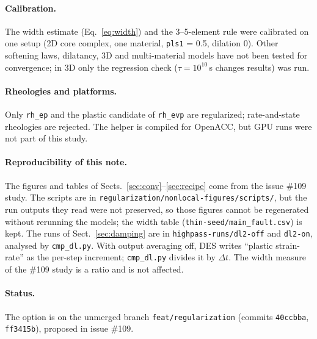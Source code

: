 \documentclass[11pt]{article}
\newcommand{\code}[1]{\texttt{#1}}
\begin{document}
\paragraph{Calibration.} The width estimate (Eq.~\ref{eq:width}) and the 3--5-element rule were
calibrated on one setup (2D core complex, one material, \code{pls1} = 0.5, dilation 0). Other
softening laws, dilatancy, 3D and multi-material models have not been tested for convergence; in 3D
only the regression check ($\tau=10^{10}$\,s changes results) was run.

\paragraph{Rheologies and platforms.} Only \code{rh\_ep} and the plastic candidate of \code{rh\_evp}
are regularized; rate-and-state rheologies are rejected. The helper is compiled for OpenACC, but GPU
runs were not part of this study.

\paragraph{Reproducibility of this note.} The figures and tables of Sects.~\ref{sec:conv}--\ref{sec:recipe}
come from the issue \#109 study. The scripts are in \code{regularization/nonlocal-figures/scripts/},
but the run outputs they read were not preserved, so those figures cannot be regenerated without
rerunning the models; the width table (\code{thin-seed/main\_fault.csv}) is kept. The runs of
Sect.~\ref{sec:damping} are in \code{highpass-runs/dl2-off} and \code{dl2-on}, analysed by
\code{cmp\_dl.py}. With output averaging off, DES writes ``plastic strain-rate'' as the per-step
increment; \code{cmp\_dl.py} divides it by $\Delta t$. The width measure of the \#109 study is a ratio
and is not affected.

\paragraph{Status.} The option is on the unmerged branch \code{feat/regularization} (commits
\code{40ccbba}, \code{ff3415b}), proposed in issue \#109.

\end{document}
